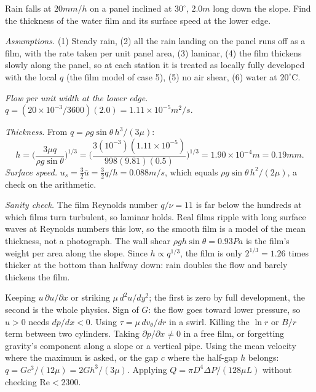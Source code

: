 \begin{example}
Rain falls at $20\unit{mm/h}$ on a panel inclined at $30^\circ$, $2.0\unit{m}$ long down the slope. Find the thickness of the water film and its surface speed at the lower edge.

\emph{Assumptions.} (1) Steady rain, (2) all the rain landing on the panel runs off as a film, with the rate taken per unit panel area, (3) laminar, (4) the film thickens slowly along the panel, so at each station it is treated as locally fully developed with the local $q$ (the film model of case 5), (5) no air shear, (6) water at $20^\circ\mathrm{C}$.

\emph{Flow per unit width at the lower edge.} $q = (20\times10^{-3}/3600)(2.0) = 1.11\times10^{-5}\unit{m^2/s}$.

\emph{Thickness.} From $q = \rho g\sin\theta\,h^3/(3\mu)$:
\[
h = \Big(\frac{3\mu q}{\rho g\sin\theta}\Big)^{1/3} = \Big(\frac{3(10^{-3})(1.11\times10^{-5})}{998(9.81)(0.5)}\Big)^{1/3} = 1.90\times10^{-4}\unit{m} = 0.19\unit{mm}.
\]
\emph{Surface speed.} $u_s = \tfrac32\bar u = \tfrac32 q/h = 0.088\unit{m/s}$, which equals $\rho g\sin\theta\,h^2/(2\mu)$, a check on the arithmetic.

\emph{Sanity check.} The film Reynolds number $q/\nu = 11$ is far below the hundreds at which films turn turbulent, so laminar holds. Real films ripple with long surface waves at Reynolds numbers this low, so the smooth film is a model of the mean thickness, not a photograph. The wall shear $\rho g h\sin\theta = 0.93\unit{Pa}$ is the film's weight per area along the slope. Since $h \propto q^{1/3}$, the film is only $2^{1/3} = 1.26$ times thicker at the bottom than halfway down: rain doubles the flow and barely thickens the film.
\end{example}

\begin{trap}
Keeping $u\,\partial u/\partial x$ or striking $\mu\,d^2u/dy^2$; the first is zero by full development, the second is the whole physics. Sign of $G$: the flow goes toward lower pressure, so $u > 0$ needs $dp/dx < 0$. Using $\tau = \mu\,dv_\theta/dr$ in a swirl. Killing the $\ln r$ or $B/r$ term between two cylinders. Taking $\partial p/\partial x \ne 0$ in a free film, or forgetting gravity's component along a slope or a vertical pipe. Using the mean velocity where the maximum is asked, or the gap $c$ where the half-gap $h$ belongs: $q = Gc^3/(12\mu) = 2Gh^3/(3\mu)$. Applying $Q = \pi D^4\Delta P/(128\mu L)$ without checking $\text{Re} < 2300$.
\end{trap}

